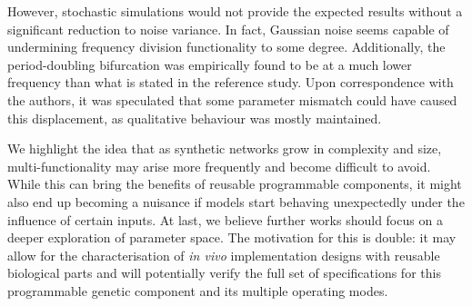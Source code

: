  However, stochastic simulations would not provide the expected results without a significant reduction to noise variance.
  In fact, Gaussian noise seems capable of undermining frequency division functionality to some degree.
  Additionally, the period-doubling bifurcation was empirically found to be at a much lower frequency than what is stated in the reference study.
  Upon correspondence with the authors, it was speculated that some parameter mismatch could have caused this displacement, as qualitative behaviour was mostly maintained.

  We highlight the idea that as synthetic networks grow in complexity and size, multi-functionality may arise more frequently and become difficult to avoid.
  While this can bring the benefits of reusable programmable components, it might also end up becoming a nuisance if models start behaving unexpectedly under the influence of certain inputs.
  At last, we believe further works should focus on a deeper exploration of parameter space.
  The motivation for this is double: it may allow for the characterisation of \textit{in vivo} implementation designs with reusable biological parts and will potentially verify the full set of specifications for this programmable genetic component and its multiple operating modes.
